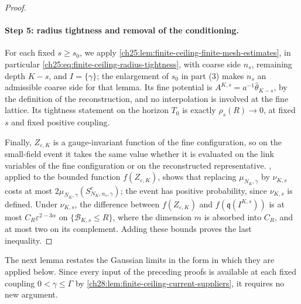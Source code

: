 \begin{proof}
\paragraph{Step 5: radius tightness and removal of the conditioning.}
For each fixed $s\ge s_0$, we apply \cref{ch25:lem:finite-ceiling-finite-mesh-estimates}, in particular \eqref{ch25:eq:finite-ceiling-radius-tightness}, with coarse side $n_s$, remaining depth $K-s$, and $I=\{\gamma\}$; the enlargement of $s_0$ in part (3) makes $n_s$ an admissible coarse side for that lemma. Its fine potential is $A^{K,s}=a^{-1}\widehat\theta_{K-s}$, by the definition of the reconstruction, and no interpolation is involved at the fine lattice. Its tightness statement on the horizon $T_0$ is exactly $\rho_s(R)\to0$, at fixed $s$ and fixed positive coupling.

Finally, $Z_{\varepsilon,K}$ is a gauge-invariant function of the fine configuration, so on the small-field event it takes the same value whether it is evaluated on the link variables of the fine configuration or on the reconstructed representative. , applied to the bounded function $f(Z_{\varepsilon,K})$, shows that replacing $\mu_{N_K,\gamma}$ by $\nu_{K,s}$ costs at most $2\mu_{N_K,\gamma}(S_{N_K,n_s,\gamma}^c)$; the event has positive probability, since $\nu_{K,s}$ is defined. Under $\nu_{K,s}$, the difference between $f(Z_{\varepsilon,K})$ and $f(\mathfrak q(I^{K,s}))$ is at most $C_R\varepsilon^{2-3\alpha}$ on $\{\mathcal B_{K,s}\le R\}$, where the dimension $m$ is absorbed into $C_R$, and at most two on its complement. Adding these bounds proves the last inequality.
\end{proof}

The next lemma restates the Gaussian limits in the form in which they are applied below. Since every input of the preceding proofs is available at each fixed coupling $0<\gamma\le\Gamma$ by \cref{ch28:lem:finite-ceiling-current-suppliers}, it requires no new argument.

